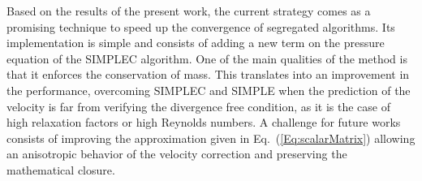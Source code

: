 \documentclass[final,3p,times,11pt,onecolumn]{myElsarticle}
\numberwithin{equation}{section}
\begin{document}
Based on the results of the present work, the current strategy comes as a promising technique to speed up the convergence of segregated algorithms. Its implementation is simple and consists of adding a new term on the pressure equation of the SIMPLEC algorithm. One of the main qualities of the method is that it enforces the conservation of mass. This translates into an improvement in the performance, overcoming SIMPLEC and SIMPLE when the prediction of the velocity is far from verifying the divergence free condition, as it is the case of high relaxation factors or high Reynolds numbers. A challenge for future works consists of improving the approximation given in Eq.~(\ref{Eq:scalarMatrix}) allowing an anisotropic behavior of the velocity correction and preserving the mathematical closure.



\end{document}
